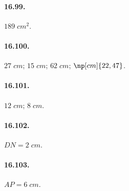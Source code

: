 \begin{multicols}{2}
\paragraph{16.99.}
$189\;\unit{cm^2}$.

\paragraph{16.100.}
$27\;\unit{cm}$; $15\;\unit{cm}$; $62\;\unit{cm}$; $\np[cm]{22,47}$.

\paragraph{16.101.}
$12\;\unit{cm}$; $8\;\unit{cm}$.

\paragraph{16.102.}
$DN=2\;\unit{cm}$.

\paragraph{16.103.}
$AP=6\;\unit{cm}$.

\end{multicols}
